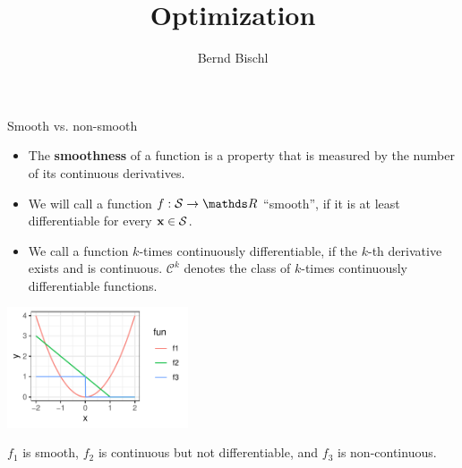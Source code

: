 





\newcommand{\titlefigure}{figure_man/hinge_vs_l2.pdf}
\newcommand{\learninggoals}{
\item TODO
\item TODO}



\title{Optimization}
\author{Bernd Bischl}
\date{}



\sloppy


\begin{vbframe}{Smooth vs. non-smooth}

\begin{itemize}
\item The \textbf{smoothness} of a function is a property that is measured by the number of its continuous derivatives. 
\item We will call a function $f: \mathcal{S} \to \R$ \enquote{smooth}, if it is at least differentiable for every $\mathbf{x} \in \mathcal{S}$. 
\item We call a function $k$-times continuously differentiable, if the $k$-th derivative exists and is continuous. $\mathcal{C}^k$ denotes the class of $k$-times continuously differentiable functions. 
\end{itemize}


\begin{center}
\includegraphics[width = 0.4\textwidth]{figure_man/hinge_vs_l2.pdf} \\ 
\begin{footnotesize}
$f_1$ is smooth, $f_2$ is continuous but not differentiable, and $f_3$ is non-continuous. 
\end{footnotesize}
\end{center}


\end{vbframe}

